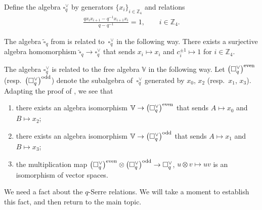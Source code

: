 \documentclass[pdftex]{sigma}
\numberwithin{equation}{section}
\begin{document}
\begin{Definition}\label{def:squarecheck} Define the algebra $\square^{\vee}_q$ by generators $\lbrace x_i\rbrace_{i \in \mathbb Z_4}$ and relations
\begin{gather}
\frac{q x_i x_{i+1} - q^{-1} x_{i+1} x_i}{q-q^{-1}} = 1, \qquad i \in \mathbb Z_4.\label{eq:checkrels}
\end{gather}
\end{Definition}
\begin{Note}\label{note:square}
The algebra $\widetilde \square_q$ from \cite[Definition~6.1]{pospart} is related to~$\square^{\vee}_q$
in the following way. There exists a surjective algebra homomorphism $\widetilde \square_q \to \square^\vee_q$ that sends $x_i \mapsto x_i $ and $c^{\pm 1}_i \mapsto 1$ for $i \in \mathbb Z_4$.
\end{Note}

The algebra $\square^\vee_q$ is related to the free algebra $\mathbb V$ in the following way. Let $\big(\square^\vee_q\big)^{\rm even}$ (resp.\ $\big(\square^\vee_q\big)^{\rm odd}$) denote the subalgebra of~$\square^\vee_q$ generated by $x_0$, $x_2$ (resp.~$x_1$, $x_3$). Adapting the proof of
\cite[Proposition~6.17]{pospart}, we see that
 \begin{enumerate}\itemsep=0pt
\item[\rm (i)]
 there exists an algebra isomorphism
 $\mathbb V \to \big(\square^\vee_q\big)^{\rm even}$ that sends
 $A\mapsto x_0$ and
 $B\mapsto x_2$;
 \item[\rm (ii)]
 there exists an algebra isomorphism
 $\mathbb V \to \big(\square^\vee_q\big)^{\rm odd}$ that sends
 $A\mapsto x_1$ and
 $B\mapsto x_3$;
 \item[\rm (iii)]
 the multiplication map
 $\big(\square^\vee_q\big)^{\rm even}
 \otimes
 \big(\square^\vee_q\big)^{\rm odd}
 \to \square^\vee_q$,
 $u \otimes v \mapsto uv$ is an isomorphism of vector spaces.
\end{enumerate}

We need a fact about the $q$-Serre relations. We will take a moment to establish this fact, and then return
to the main topic.
\end{document}
